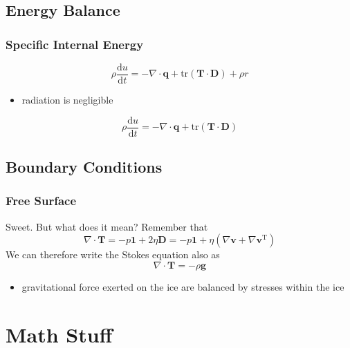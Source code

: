 \documentclass[hide notes,intlimits]{beamer}
\begin{document}
\subsection{Energy Balance}

\begin{frame}
  \frametitle{Specific Internal Energy}
  \begin{equation}
    \rho\frac{\text{d} u}{\text{d} t} = - \nabla \cdot \mathbf{q} + \text{tr} \left(\mathbf{T}\cdot\mathbf{D}\right) + \rho r
  \end{equation}
  \begin{itemize}
  \item radiation is negligible
 \end{itemize}
  \begin{equation}
    \rho\frac{\text{d} u}{\text{d} t} = - \nabla \cdot \mathbf{q} + \text{tr} \left(\mathbf{T}\cdot\mathbf{D}\right)
  \end{equation}
\end{frame}



\subsection{Boundary Conditions}


\begin{frame}
  \frametitle{Free Surface}
  Sweet. But what does it mean?
  Remember that 
  \begin{equation*} \nabla \cdot \mathbf{T} =  -p\mathbf{1} + 2\eta \mathbf{D} = -p\mathbf{1} + \eta\left(\nabla \mathbf{v} + \nabla \mathbf{v}^{\text{T}}\right)
  \end{equation*}
  We can therefore write the Stokes equation also as
 \begin{equation*}
    \nabla \cdot \mathbf{T} = - \rho \mathbf{g}
  \end{equation*}
  \begin{itemize}
    \item gravitational force exerted on the ice are balanced by stresses within the ice
  \end{itemize}
\end{frame}


\section{Math Stuff}
\end{document}
